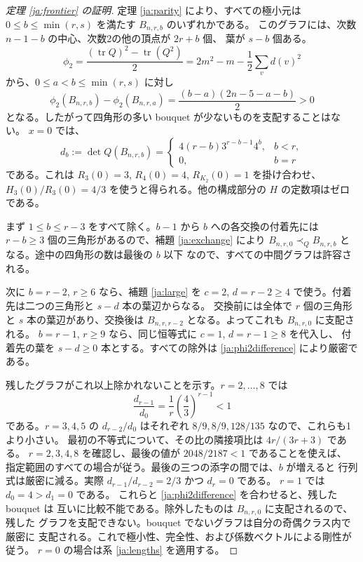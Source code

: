 \documentclass[12pt]{amsart}
\theoremstyle{definition}
\theoremstyle{remark}
\numberwithin{equation}{section}
\DeclareMathOperator{\tr}{tr}
\begin{document}
\begin{proof}[定理 \ref{ja:frontier} の証明]
定理 \ref{ja:parity} により、すべての極小元は
$0\le b\le\min(r,s)$ を満たす $B_{n,r,b}$ のいずれかである。
このグラフには、次数 $n-1-b$ の中心、次数2の他の頂点が $2r+b$ 個、
葉が $s-b$ 個ある。
\[
 \phi_2=\frac{(\tr Q)^2-\tr(Q^2)}2
       =2m^2-m-\frac12\sum_vd(v)^2
\]
から、$0\le a<b\le\min(r,s)$ に対し
\begin{equation}\label{ja:phi2difference}
 \phi_2(B_{n,r,b})-\phi_2(B_{n,r,a})
       =\frac{(b-a)(2n-5-a-b)}2>0
\end{equation}
となる。したがって四角形の多い bouquet が少ないものを支配することはない。
$x=0$ では、
\begin{equation}\label{ja:det}
 d_b:=\det Q(B_{n,r,b})=
 \begin{cases}4(r-b)3^{r-b-1}4^b,&b<r,\\0,&b=r
 \end{cases}
\end{equation}
である。これは $R_3(0)=3$, $R_4(0)=4$, $R_{K_2}(0)=1$ を掛け合わせ、
$H_3(0)/R_3(0)=4/3$ を使うと得られる。他の構成部分の $H$ の定数項はゼロである。

まず $1\le b\le r-3$ をすべて除く。$b-1$ から $b$ への各交換の付着先には
$r-b\ge3$ 個の三角形があるので、補題 \ref{ja:exchange} により
$B_{n,r,0}\prec_Q B_{n,r,b}$ となる。途中の四角形の数は最後の $b$ 以下
なので、すべての中間グラフは許容される。

次に $b=r-2$, $r\ge6$ なら、補題 \ref{ja:large} を $c=2$,
$d=r-2\ge4$ で使う。付着先は二つの三角形と $s-d$ 本の葉辺からなる。
交換前には全体で $r$ 個の三角形と $s$ 本の葉辺があり、交換後は
$B_{n,r,r-2}$ となる。よってこれも $B_{n,r,0}$ に支配される。
$b=r-1$, $r\ge9$ なら、同じ恒等式に $c=1$, $d=r-1\ge8$ を代入し、
付着先の葉を $s-d\ge0$ 本とする。すべての除外は
\eqref{ja:phi2difference} により厳密である。

残したグラフがこれ以上除かれないことを示す。$r=2,\ldots,8$ では
\[
 \frac{d_{r-1}}{d_0}=\frac1r\left(\frac43\right)^{r-1}<1
\]
である。$r=3,4,5$ の $d_{r-2}/d_0$ はそれぞれ
$8/9,8/9,128/135$ なので、これらも1より小さい。
最初の不等式について、その比の隣接項比は $4r/(3r+3)$ である。
$r=2,3,4,8$ を確認し、最後の値が $2048/2187<1$ であることを使えば、
指定範囲のすべての場合が従う。最後の三つの添字の間では、$b$ が増えると
行列式は厳密に減る。実際 $d_{r-1}/d_{r-2}=2/3$ かつ $d_r=0$ である。
$r=1$ では $d_0=4>d_1=0$ である。
これらと \eqref{ja:phi2difference} を合わせると、残した bouquet は
互いに比較不能である。除外したものは $B_{n,r,0}$ に支配されるので、残した
グラフを支配できない。bouquet でないグラフは自分の奇偶クラス内で厳密に
支配される。これで極小性、完全性、および係数ベクトルによる剛性が従う。
$r=0$ の場合は系 \ref{ja:lengths} を適用する。
\end{proof}
\end{document}
